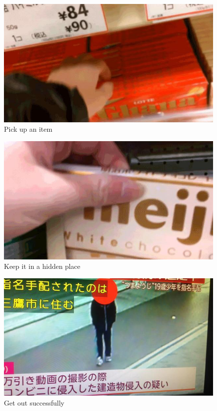 \begin{figure}
	\centering
	\begin{minipage}{.3\textwidth}
		\centering
		\includegraphics[width=1\linewidth]{shoplifting1.jpg}
		\\
	Pick up an item
	\end{minipage}%
	\begin{minipage}{.3\textwidth}
		\centering
		\includegraphics[width=1\linewidth]{shoplifting2.jpg}
		\\
	Keep it in a hidden place
		\end{minipage}
	\begin{minipage}{.3\textwidth}
		\centering
		\includegraphics[width=1\linewidth]{shoplifting3.jpg}
		\\
		Get out successfully
	\end{minipage}
		

\end{figure}
